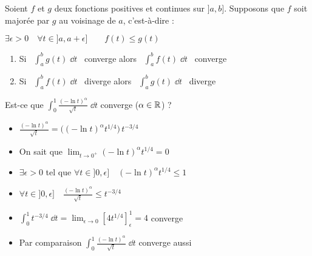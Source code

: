 \begin{frame}

\begin{theoreme}[de comparaison]
Soient $f$ et $g$ deux fonctions positives et continues sur $]a,b]$.  Supposons que $f$ soit majorée par $g$ au voisinage de $a$, c'est-à-dire :
\centerline{$\exists \epsilon>0 \quad \forall t\in ]a,a+\epsilon] \qquad f(t)\le g(t)$}
\vspace*{-2ex}
\begin{enumerate}
  \item Si \  $\int_a^{b} g(t)\;\dd t$ \ converge alors \  $\int_a^{b} f(t)\;\dd t$ \  converge
  \item Si \  $\int_a^{b} f(t)\;\dd t$ \  diverge alors \  $\int_a^{b} g(t)\;\dd t$ \  diverge
\end{enumerate}
\end{theoreme}

\pause


Est-ce que $\int_0^1 \frac{(-\ln t)^\alpha}{\sqrt{t}}\;\dd t$ converge ($\alpha\in\mathbb{R}$) ?
\pause
\begin{itemize}
  \item $\frac{(-\ln t)^\alpha}{\sqrt{t}} = \big((-\ln t)^\alpha t^{1/4}\big)\,t^{-3/4}$

\pause
  
  \item On sait que $\lim_{t\rightarrow 0^+}  (-\ln t)^\alpha t^{1/4}=0$
 
\pause
  
  \item  $\exists \epsilon>0$ tel que 
  $\forall t\in]0,\epsilon]\quad (-\ln t)^\alpha t^{1/4}\le 1$ 

\pause


  \item $\forall t\in]0,\epsilon]\quad \frac{(-\ln t)^\alpha}{\sqrt{t}} \le t^{-3/4}$

\pause
  
  \item $\int_0^1 t^{-3/4}\;\dd t = \lim_{\epsilon\to0} [4t^{1/4}]_\epsilon^1 = 4$ converge

\pause
  
  \item Par comparaison $\int_0^1 \frac{(-\ln t)^\alpha}{\sqrt{t}}\;\dd t$ converge aussi  
\end{itemize}

\end{frame}



